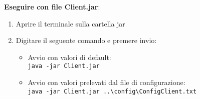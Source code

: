 \documentclass[11pt, a4paper, oneside]{article}
\begin{document}
\textbf{Eseguire con file Client.jar}:
\begin{enumerate}
    \item Aprire il terminale sulla cartella jar
    \item Digitare il seguente comando e premere invio:
    \begin{itemize}
        \item Avvio con valori di default:\\
        \texttt{java -jar Client.jar}
        \item Avvio con valori prelevati dal file di configurazione:\\
        \texttt{java -jar Client.jar ..\textbackslash config\textbackslash ConfigClient.txt}
    \end{itemize}
\end{enumerate}


%
\end{document}
